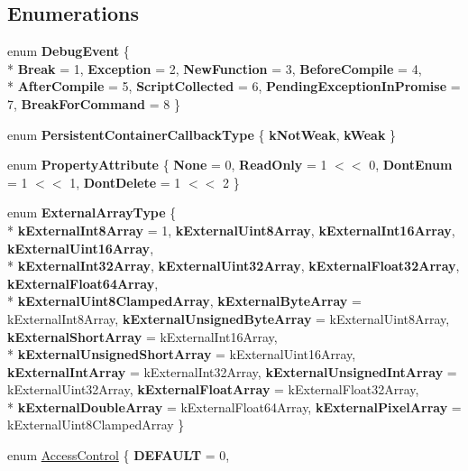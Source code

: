 \subsection*{Enumerations}
\begin{DoxyCompactItemize}
\item 
enum {\bfseries Debug\-Event} \{ \\*
{\bfseries Break} =  1, 
{\bfseries Exception} =  2, 
{\bfseries New\-Function} =  3, 
{\bfseries Before\-Compile} =  4, 
\\*
{\bfseries After\-Compile} =  5, 
{\bfseries Script\-Collected} =  6, 
{\bfseries Pending\-Exception\-In\-Promise} =  7, 
{\bfseries Break\-For\-Command} =  8
 \}
\item 
enum {\bfseries Persistent\-Container\-Callback\-Type} \{ {\bfseries k\-Not\-Weak}, 
{\bfseries k\-Weak}
 \}
\item 
enum {\bfseries Property\-Attribute} \{ {\bfseries None} =  0, 
{\bfseries Read\-Only} =  1 $<$$<$ 0, 
{\bfseries Dont\-Enum} =  1 $<$$<$ 1, 
{\bfseries Dont\-Delete} =  1 $<$$<$ 2
 \}
\item 
enum {\bfseries External\-Array\-Type} \{ \\*
{\bfseries k\-External\-Int8\-Array} =  1, 
{\bfseries k\-External\-Uint8\-Array}, 
{\bfseries k\-External\-Int16\-Array}, 
{\bfseries k\-External\-Uint16\-Array}, 
\\*
{\bfseries k\-External\-Int32\-Array}, 
{\bfseries k\-External\-Uint32\-Array}, 
{\bfseries k\-External\-Float32\-Array}, 
{\bfseries k\-External\-Float64\-Array}, 
\\*
{\bfseries k\-External\-Uint8\-Clamped\-Array}, 
{\bfseries k\-External\-Byte\-Array} =  k\-External\-Int8\-Array, 
{\bfseries k\-External\-Unsigned\-Byte\-Array} =  k\-External\-Uint8\-Array, 
{\bfseries k\-External\-Short\-Array} =  k\-External\-Int16\-Array, 
\\*
{\bfseries k\-External\-Unsigned\-Short\-Array} =  k\-External\-Uint16\-Array, 
{\bfseries k\-External\-Int\-Array} =  k\-External\-Int32\-Array, 
{\bfseries k\-External\-Unsigned\-Int\-Array} =  k\-External\-Uint32\-Array, 
{\bfseries k\-External\-Float\-Array} =  k\-External\-Float32\-Array, 
\\*
{\bfseries k\-External\-Double\-Array} =  k\-External\-Float64\-Array, 
{\bfseries k\-External\-Pixel\-Array} =  k\-External\-Uint8\-Clamped\-Array
 \}
\item 
enum \hyperlink{namespacev8_a31d8355cb043d7d2dda3f4a52760b64e}{Access\-Control} \{ {\bfseries D\-E\-F\-A\-U\-L\-T} =  0, 
$$
\end{DoxyCompactItemize}
